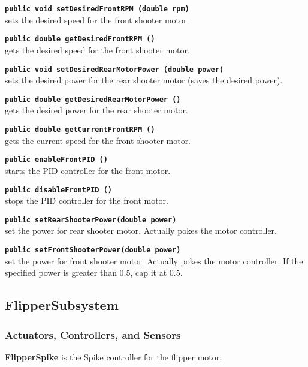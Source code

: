 \documentclass[]{article}
\begin{document}
\noindent \texttt{\textbf{public void setDesiredFrontRPM (double rpm)}} \\
sets the desired speed for the front shooter motor.

\noindent \texttt{\textbf{public double getDesiredFrontRPM ()}} \\
gets the desired speed for the front shooter motor.

\noindent \texttt{\textbf{public void setDesiredRearMotorPower (double power)}} \\
sets the desired power for the rear shooter motor (saves the desired power).

\noindent \texttt{\textbf{public double getDesiredRearMotorPower ()}} \\
gets the desired power for the rear shooter motor.

\noindent \texttt{\textbf{public double getCurrentFrontRPM ()}} \\
gets the current speed for the front shooter motor.

\noindent \texttt{\textbf{public enableFrontPID ()}} \\
starts the PID controller for the front motor.

\noindent \texttt{\textbf{public disableFrontPID ()}} \\
stops the PID controller for the front motor.

\noindent \texttt{\textbf{public setRearShooterPower(double power)}} \\
set the power for rear shooter motor. Actually pokes the motor controller.

\noindent \texttt{\textbf{public setFrontShooterPower(double power)}} \\
set the power for front shooter motor. Actually pokes the motor controller. If the specified power is greater than 0.5, cap it at 0.5.


\subsection{FlipperSubsystem}

\subsubsection{Actuators, Controllers, and Sensors}

\textbf{FlipperSpike} is the Spike controller for the flipper motor.
\end{document}
